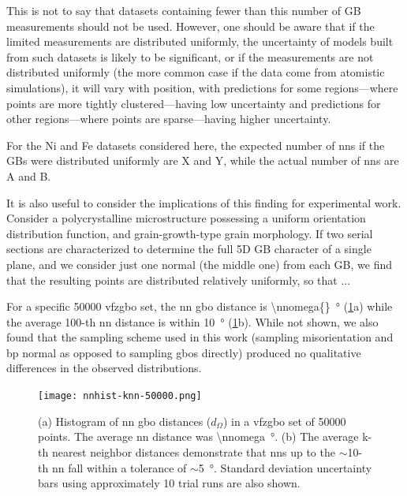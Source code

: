 \documentclass[final,twocolumn,12pt]{elsarticle}
\begin{document}
	This is not to say that datasets containing fewer than this number of GB measurements should not be used. However, one should be aware that if the limited measurements are distributed uniformly, the uncertainty of models built from such datasets is likely to be significant, or if the measurements are not distributed uniformly (the more common case if the data come from atomistic simulations), it will vary with position, with predictions for some regions---where points are more tightly clustered---having low uncertainty and predictions for other regions---where points are sparse---having higher uncertainty.
	
	For the Ni and Fe datasets considered here, the expected number of \glspl{nn} if the GBs were distributed uniformly are X and Y, while the actual number of \glspl{nn} are A and B.
	
	It is also useful to consider the implications of this finding for experimental work. Consider a polycrystalline microstructure possessing a uniform orientation distribution function, and grain-growth-type grain morphology. If two serial sections are characterized to determine the full 5D GB character of a single plane, and we consider just one normal (the middle one) from each GB, we find that the resulting points are distributed relatively uniformly, so that ...
	
	For a specific \num{50000} \gls{vfzgbo} set, the \gls{nn} \gls{gbo} distance is \SI{\nnomega{}}{\degree} (\cref{fig:nnhist-knn-50000}a) while the average 100-th \gls{nn} distance is within \SI{10}{\degree} (\cref{fig:nnhist-knn-50000}b). While not shown, we also found that the sampling scheme used in this work (sampling misorientation and \gls{bp} normal as opposed to sampling \glspl{gbo} directly) produced no qualitative differences in the observed distributions.
	
	\begin{figure}
		\centering
		\texttt{[image: nnhist-knn-50000.png]}
		\caption{(a) Histogram of \gls{nn} \gls{gbo} distances ($d_{\Omega}$) in a \gls{vfzgbo} set of \num{50000} points. The average \gls{nn} distance was \SI{\nnomega}{\degree}. (b) The average k-th nearest neighbor distances demonstrate that \glspl{nn} up to the $\sim$\num{10}-th \gls{nn} fall within a tolerance of $\sim$\SI{5}{\degree}. Standard deviation uncertainty bars using approximately 10 trial runs are also shown. }
		\label{fig:nnhist-knn-50000}
	\end{figure}
	
\end{document}
